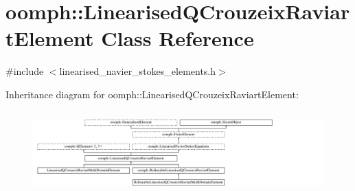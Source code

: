 \hypertarget{classoomph_1_1LinearisedQCrouzeixRaviartElement}{}\section{oomph\+:\+:Linearised\+Q\+Crouzeix\+Raviart\+Element Class Reference}
\label{classoomph_1_1LinearisedQCrouzeixRaviartElement}


{\ttfamily \#include $<$linearised\+\_\+navier\+\_\+stokes\+\_\+elements.\+h$>$}

Inheritance diagram for oomph\+:\+:Linearised\+Q\+Crouzeix\+Raviart\+Element\+:\begin{figure}[H]
\begin{center}
\leavevmode
\includegraphics[height=3.181818cm]{classoomph_1_1LinearisedQCrouzeixRaviartElement}
\end{center}
\end{figure}
